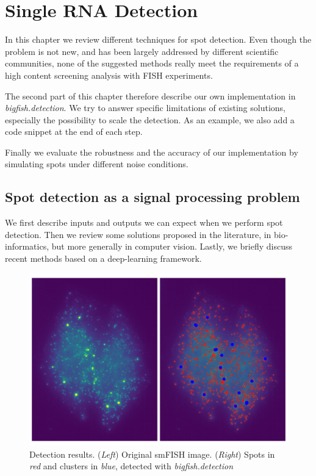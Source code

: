 
\graphicspath{{./figures/chapter2/}}


\chapter{Single RNA Detection}
\label{ch:chapter2}

\minitoc
\newpage

In this chapter we review different techniques for spot detection.
Even though the problem is not new, and has been largely addressed by different scientific communities, none of the suggested methods really meet the requirements of a high content screening analysis with \ac{FISH} experiments.

The second part of this chapter therefore describe our own implementation in \mbox{\emph{bigfish.detection}}.
We try to answer specific limitations of existing solutions, especially the possibility to scale the detection.
As an example, we also add a code snippet at the end of each step.

Finally we evaluate the robustness and the accuracy of our implementation by simulating spots under different noise conditions.

\section{Spot detection as a signal processing problem}
\label{sec:detection_introduction}

We first describe inputs and outputs we can expect when we perform spot detection.
Then we review some solutions proposed in the literature, in bio-informatics, but more generally in computer vision.
Lastly, we briefly discuss recent methods based on a deep-learning framework.

\begin{figure}[h]
    \centering
    \includegraphics[width=1\textwidth]{figures/chapter2/cluster_detection_results}
	\caption{Detection results.
	(\textit{Left}) Original smFISH image.
	(\textit{Right}) Spots in \textit{red} and clusters in \textit{blue}, detected with \emph{bigfish.detection}}
    \label{fig:detection_results}
\end{figure}

